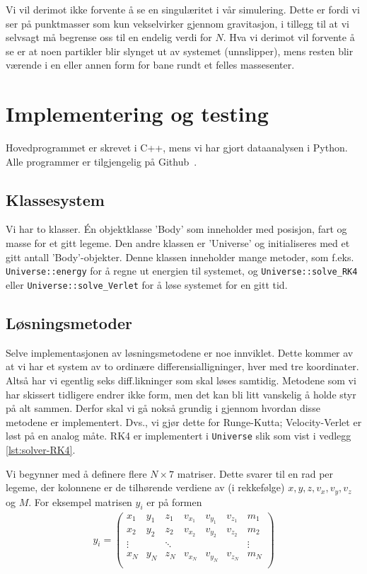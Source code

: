 \documentclass[11pt]{article}
\begin{document}
\begin{multicols}{2}
Vi vil derimot ikke forvente å se en singulæritet i vår
simulering. Dette er fordi vi ser på punktmasser som kun vekselvirker
gjennom gravitasjon, i tillegg til at vi selvsagt må begrense oss til
en endelig verdi for $N$. Hva vi derimot vil forvente å se er at noen
partikler blir slynget ut av systemet (unnslipper), mens resten blir
værende i en eller annen form for bane rundt et felles massesenter. 

\section{Implementering og testing}
Hovedprogrammet er skrevet i C++, mens vi har gjort dataanalysen i Python.
Alle programmer er tilgjengelig på Github~\cite{github-repo}. 

\subsection{Klassesystem}
Vi har to klasser. Én objektklasse 'Body' som inneholder med posisjon, fart 
og masse for et gitt legeme. Den andre klassen er 'Universe' og initialiseres
med et gitt antall 'Body'-objekter. Denne klassen inneholder mange metoder,
som f.eks. \texttt{Universe::energy} for å regne ut energien til systemet, og 
\texttt{Universe::solve\_RK4} eller \texttt{Universe::solve\_Verlet} for å løse systemet
for en gitt tid.

\subsection{Løsningsmetoder}
Selve implementasjonen av løsningsmetodene er noe innviklet. Dette
kommer av at vi har et system av to ordinære differensialligninger,
hver med tre koordinater. Altså har vi egentlig seks diff.likninger
som skal løses samtidig. Metodene som vi har skissert tidligere endrer
ikke form, men det kan bli litt vanskelig å holde styr på alt
sammen. Derfor skal vi gå nokså grundig i gjennom hvordan disse
metodene er implementert. Dvs., vi gjør dette for Runge-Kutta;
Velocity-Verlet er løst på en analog måte. RK4 er implementert i
\texttt{Universe} slik som vist i vedlegg \ref{lst:solver-RK4}. 

Vi begynner med å definere flere $N\times 7$ matriser. Dette svarer til
en rad per legeme, der kolonnene er de tilhørende verdiene av (i rekkefølge) $x,y,z,v_x,v_y,v_z$
og $M$. For eksempel matrisen $y_i$ er på formen
\begin{align*}
  y_i = \begin{pmatrix}
    x_1&y_1&z_1&v_{x_1}&v_{y_1} &v_{z_1} & m_1\\
    x_2&y_2&z_2&v_{x_2}&v_{y_2} &v_{z_2} & m_2\\
    \vdots&&\ddots&&&&\vdots\\
    x_N&y_N&z_N&v_{x_N}&v_{y_N} &v_{z_N} & m_N\\
  \end{pmatrix}
\end{align*}


\end{multicols}
\end{document}
